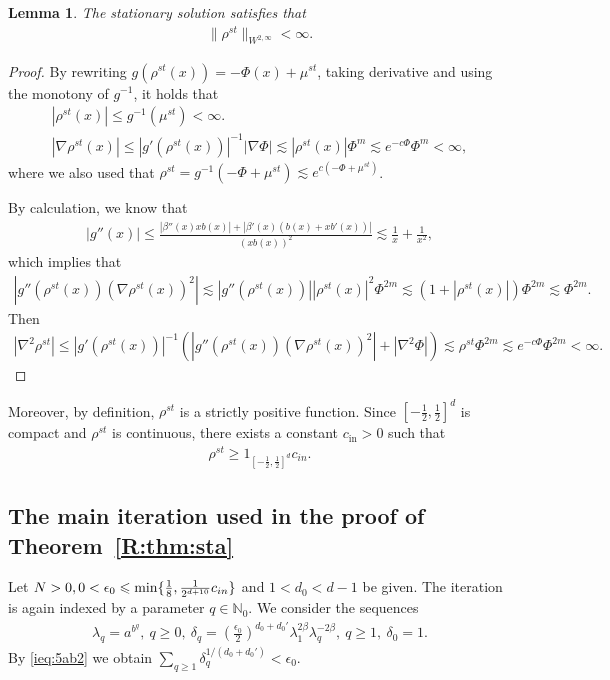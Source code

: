 \documentclass[UTF-8,reqno]{amsart}
\numberwithin{equation}{section}
\newtheorem{lemma}[theorem]{Lemma}
\theoremstyle{definition}
\def\min{{\mathord{{\rm min}}}}
\def\geq{\geqslant}
\def\leq{\leqslant}
\def\min{{\mathord{{\rm min}}}}
\def\bl{\begin{lemma}}
\def\el{\end{lemma}}
\def\geq{\geqslant}
\def\leq{\leqslant}
\begin{document}
\bl
The stationary solution satisfies that 
\begin{align}
    \|\rho^{st}\|_{W^{2,\infty}}<\infty.\label{R:rhostc2}
\end{align}
\el
\begin{proof}
    By rewriting $ g(\rho^{st}(x))=-\Phi(x)+\mu^{st} $, taking derivative and using the monotony of $g^{-1}$, it holds that
    \begin{align*}
        |\rho^{st}(x)|\leq g^{-1}(\mu^{st})<\infty.\\
         |\nabla\rho^{st}(x)|\leq |g'(\rho^{st}(x))|^{-1}|\nabla\Phi|\lesssim|\rho^{st}(x)|\Phi^m\lesssim e^{-c \Phi} \Phi^m<\infty,
    \end{align*}
    where we also used that $\rho^{st}=g^{-1}(-\Phi+\mu^{st} )\lesssim e^{c(-\Phi+\mu^{st} )}$.
    
    By calculation, we know that 
    \begin{align*}
        |g''(x)|\leq \frac{|\beta''(x)xb(x)|+|\beta'(x)(b(x)+xb'(x))|}{(xb(x))^2}\lesssim \frac{1}{x}+\frac{1}{x^2},
    \end{align*}
    which implies that 
    \begin{align*}
         |g''(\rho^{st}(x))(\nabla\rho^{st}(x))^2|\lesssim |g''(\rho^{st}(x))||\rho^{st}(x)|^2\Phi^{2m}\lesssim (1+|\rho^{st}(x)|)\Phi^{2m}\lesssim \Phi^{2m}.
    \end{align*}
    Then 
    \begin{align*}
        |\nabla^2\rho^{st}|\leq |g'(\rho^{st}(x))|^{-1}(|g''(\rho^{st}(x))(\nabla\rho^{st}(x))^2|+|\nabla^2\Phi|)\lesssim \rho^{st}\Phi^{2m} \lesssim e^{-c \Phi} \Phi^{2m}<\infty.
    \end{align*}
\end{proof}
Moreover, by definition, $\rho^{st}$ is a strictly positive function. Since $[-\frac12,\frac12]^d$ is compact and $\rho^{st}$ is continuous, there exists a constant $c_{\mathrm{in}}>0$ such that 
\begin{align}
    \rho^{st}\geq 1_{[-\frac12,\frac12]^d}c_{in}.\label{R:rhost>}
\end{align}


\subsection{The main iteration used in the proof of Theorem~\ref{R:thm:sta}}

Let $N>0,0<\epsilon_0\leq \min\{ \frac18, \frac1 {2^{d+10}} c_{in}\}$ and $1<d_0<d-1$ be given.   The iteration is again indexed by a parameter
$
q\in\mathbb{N}_0.
$
We consider the sequences
 \begin{align*}
\lambda_q
=
a^{b^q},
\ 
q\geq0,
\ 
\delta_q
=
(\frac{\epsilon_0}{2})^{d_0+d_0'}
\lambda_1^{2\beta}
\lambda_q^{-2\beta},
\ 
q\geq1,
\ 
\delta_0=1.
\end{align*}  By \eqref{ieq:5ab2}
we obtain $
\sum_{q\geq1}\delta_q^{1/(d_0+d_0')}
<
\epsilon_0.
$
\end{document}
